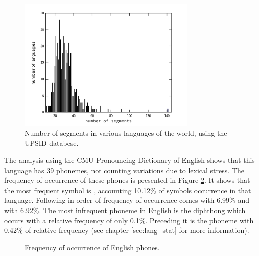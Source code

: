 \begin{figure}[h!]
\centering
\includegraphics[width=0.75\textwidth]{images/segments_hist_upsid2.pdf}
\caption{Number of segments in various languages of the world, using the UPSID databese.} %
\label{fig:language_segments_hist}
\end{figure}

The analysis using the CMU Pronouncing Dictionary of English shows that this language has 39 phonemes, not counting variations due to lexical stress. The frequency of occurrence of these phones is presented in Figure \ref{fig:phones_hist_en}. It shows that the most frequent symbol is \textipa{[@]}, accounting 10.12\% of symbols occurrence in that language. Following in order of frequency of occurrence comes \textipa{[t]} with 6.99\% and \textipa{[n]} with 6.92\%. The most infrequent phoneme in English is the diphthong \textipa{[OI]} which occurs with a relative frequency of only 0.1\%. Preceding it is the phoneme \textipa{[U]} with 0.42\% of relative frequency (see chapter \ref{sec:lang_stat} for more information).

\begin{figure}[h!]
\noindent{}
\caption{Frequency of occurrence of English phones.}
\label{fig:phones_hist_en}
\end{figure}

